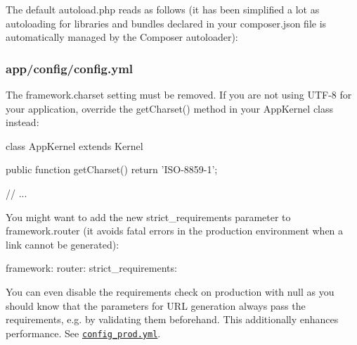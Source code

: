 The default {\ttfamily autoload.\+php} reads as follows (it has been simplified a lot as autoloading for libraries and bundles declared in your {\ttfamily composer.\+json} file is automatically managed by the Composer autoloader)\+: 


\subsubsection*{{\ttfamily app/config/config.\+yml}}

The {\ttfamily framework.\+charset} setting must be removed. If you are not using {\ttfamily U\+T\+F-\/8} for your application, override the {\ttfamily get\+Charset()} method in your {\ttfamily App\+Kernel} class instead\+: \begin{DoxyVerb}class AppKernel extends Kernel
{
    public function getCharset()
    {
        return 'ISO-8859-1';
    }

    // ...
}
\end{DoxyVerb}


You might want to add the new {\ttfamily strict\+\_\+requirements} parameter to {\ttfamily framework.\+router} (it avoids fatal errors in the production environment when a link cannot be generated)\+: \begin{DoxyVerb}framework:
    router:
        strict_requirements: %
\end{DoxyVerb}


You can even disable the requirements check on production with {\ttfamily null} as you should know that the parameters for U\+R\+L generation always pass the requirements, e.\+g. by validating them beforehand. This additionally enhances performance. See \href{https://github.com/symfony/symfony-standard/blob/master/app/config/config_prod.yml}{\tt config\+\_\+prod.\+yml}.

